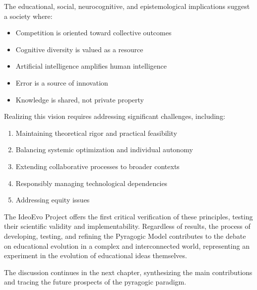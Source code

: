 The educational, social, neurocognitive, and epistemological implications suggest a society where:

\begin{itemize}
	\item Competition is oriented toward collective outcomes
	\item Cognitive diversity is valued as a resource
	\item Artificial intelligence amplifies human intelligence
	\item Error is a source of innovation
	\item Knowledge is shared, not private property
\end{itemize}

Realizing this vision requires addressing significant challenges, including:

\begin{enumerate}
	\item Maintaining theoretical rigor and practical feasibility
	\item Balancing systemic optimization and individual autonomy
	\item Extending collaborative processes to broader contexts
	\item Responsibly managing technological dependencies
	\item Addressing equity issues
\end{enumerate}

The IdeoEvo Project offers the first critical verification of these principles, testing their scientific validity and implementability. Regardless of results, the process of developing, testing, and refining the Pyragogic Model contributes to the debate on educational evolution in a complex and interconnected world, representing an experiment in the evolution of educational ideas themselves.

The discussion continues in the next chapter, synthesizing the main contributions and tracing the future prospects of the pyragogic paradigm.
